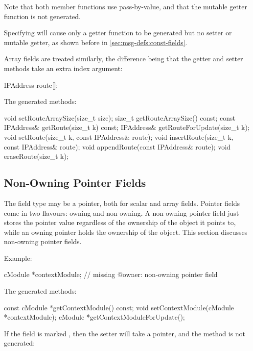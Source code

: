Note that both member functions use pass-by-value, and that the mutable getter
function is not generated.

Specifying  will cause only a getter function to be generated
but no setter or mutable getter, as shown before in \ref{sec:msg-defs:const-fields}.

Array fields are treated similarly, the difference being that the getter and setter
methods take an extra index argument:

\begin{msg}
IPAddress route[];
\end{msg}

The generated methods:

\begin{cpp}
void setRouteArraySize(size_t size);
size_t getRouteArraySize() const;
const IPAddress& getRoute(size_t k) const;
IPAddress& getRouteForUpdate(size_t k);
void setRoute(size_t k, const IPAddress& route);
void insertRoute(size_t k, const IPAddress& route);
void appendRoute(const IPAddress& route);
void eraseRoute(size_t k);
\end{cpp}


\subsection{Non-Owning Pointer Fields}
\label{sec:msg-defs:pointers-fields}

The field type may be a pointer, both for scalar and array fields. Pointer
fields come in two flavours: owning and non-owning. A non-owning pointer field
just stores the pointer value regardless of the ownership of the object it
points to, while an owning pointer holds the ownership of the object. This
section discusses non-owning pointer fields.

Example:

\begin{msg}
cModule *contextModule;  // missing @owner: non-owning pointer field
\end{msg}

The generated methods:

\begin{cpp}
const cModule *getContextModule() const;
void setContextModule(cModule *contextModule);
cModule *getContextModuleForUpdate();
\end{cpp}

If the field is marked , then the setter will take a
 pointer, and the  method is not generated:

